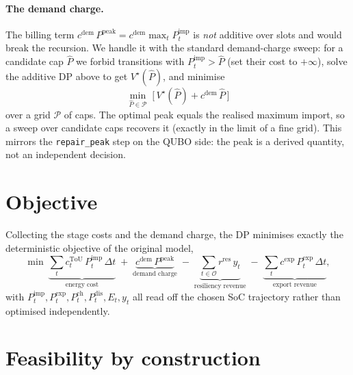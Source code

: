 \documentclass[11pt]{article}
\newcommand{\Pimp}{P^{\text{imp}}}
\newcommand{\Pexp}{P^{\text{exp}}}
\newcommand{\Pch}{P^{\text{ch}}}
\newcommand{\Pdis}{P^{\text{dis}}}
\newcommand{\Ppk}{P^{\text{peak}}}
\newcommand{\cdem}{c^{\text{dem}}}
\newcommand{\ctou}{c^{\text{ToU}}}
\newcommand{\cexp}{c^{\text{exp}}}
\newcommand{\rres}{r^{\text{res}}}
\begin{document}
\paragraph{The demand charge.}
The billing term $\cdem\,\Ppk = \cdem \max_t \Pimp_t$ is \emph{not} additive over
slots and would break the recursion. We handle it with the standard
demand-charge sweep: for a candidate cap $\hat{P}$ we forbid transitions with
$\Pimp_t>\hat{P}$ (set their cost to $+\infty$), solve the additive DP above to
get $V^\star(\hat{P})$, and minimise
\begin{equation}
  \min_{\hat{P}\in\mathcal{P}}\; \bigl[\,V^\star(\hat{P}) + \cdem\,\hat{P}\,\bigr]
\end{equation}
over a grid $\mathcal{P}$ of caps. The optimal peak equals the realised maximum
import, so a sweep over candidate caps recovers it (exactly in the limit of a
fine grid). This mirrors the \texttt{repair\_peak} step on the QUBO side: the
peak is a derived quantity, not an independent decision.

\section{Objective}

Collecting the stage costs and the demand charge, the DP minimises exactly the
deterministic objective of the original model,
\begin{equation}
  \min\
  \underbrace{\sum_{t}\ctou_t\,\Pimp_t\,\Delta t}_{\text{energy cost}}
  \;+\;
  \underbrace{\cdem\,\Ppk}_{\text{demand charge}}
  \;-\;
  \underbrace{\sum_{t\in\mathcal{O}}\rres\,y_t}_{\text{resiliency revenue}}
  \;-\;
  \underbrace{\sum_{t}\cexp\,\Pexp_t\,\Delta t}_{\text{export revenue}},
\end{equation}
with $\Pimp_t,\Pexp_t,\Pch_t,\Pdis_t,E_t,y_t$ all read off the chosen SoC
trajectory rather than optimised independently.

\section{Feasibility by construction}
\end{document}
